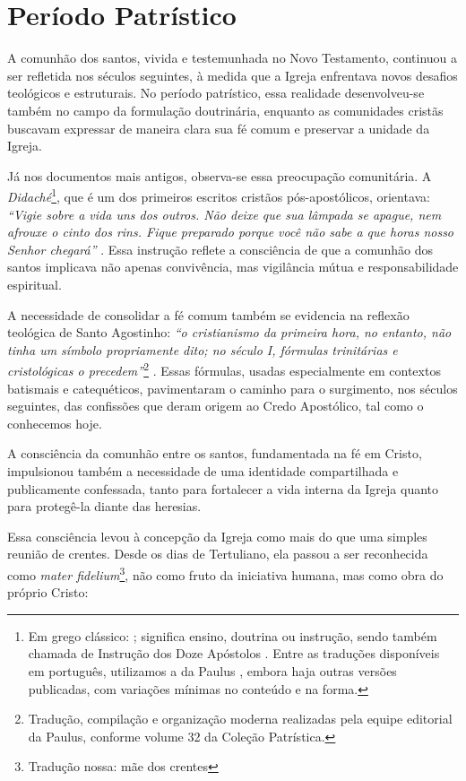 \section{Período Patrístico}

A comunhão dos santos, vivida e testemunhada no Novo Testamento, continuou a ser refletida nos séculos seguintes, à medida que a Igreja enfrentava novos desafios teológicos e estruturais. No período patrístico, essa realidade desenvolveu-se também no campo da formulação doutrinária, enquanto as comunidades cristãs buscavam expressar de maneira clara sua fé comum e preservar a unidade da Igreja.

Já nos documentos mais antigos, observa-se essa preocupação comunitária. A \textit{Didaché}\footnote{Em grego clássico: \textit{}; significa ensino, doutrina ou instrução, sendo também chamada de Instrução dos Doze Apóstolos \cite{wikididaque}. Entre as traduções disponíveis em português, utilizamos a da Paulus \cite{didachePaulus2013}, embora haja outras versões publicadas, com variações mínimas no conteúdo e na forma.}, que é um dos primeiros escritos cristãos pós-apostólicos, orientava: \textit{``Vigie sobre a vida uns dos outros. Não deixe que sua lâmpada se apague, nem afrouxe o cinto dos rins. Fique preparado porque você não sabe a que horas nosso Senhor chegará''} \cite{didachePaulus2013}. Essa instrução reflete a consciência de que a comunhão dos santos implicava não apenas convivência, mas vigilância mútua e responsabilidade espiritual.

A necessidade de consolidar a fé comum também se evidencia na reflexão teológica de Santo Agostinho: \textit{``o cristianismo da primeira hora, no entanto, não tinha um símbolo propriamente dito; no século I, fórmulas trinitárias e cristológicas o precedem''}\footnote{Tradução, compilação e organização moderna realizadas pela equipe editorial da Paulus, conforme volume 32 da Coleção Patrística.} \cite[p.~8]{santos2013}. Essas fórmulas, usadas especialmente em contextos batismais e catequéticos, pavimentaram o caminho para o surgimento, nos séculos seguintes, das confissões que deram origem ao Credo Apostólico, tal como o conhecemos hoje.

A consciência da comunhão entre os santos, fundamentada na fé em Cristo, impulsionou também a necessidade de uma identidade compartilhada e publicamente confessada, tanto para fortalecer a vida interna da Igreja quanto para protegê-la diante das heresias.

Essa consciência levou à concepção da Igreja como mais do que uma simples reunião de crentes. Desde os dias de Tertuliano, ela passou a ser reconhecida como \textit{mater fidelium}\footnote{Tradução nossa: mãe dos crentes}, não como fruto da iniciativa humana, mas como obra do próprio Cristo:

